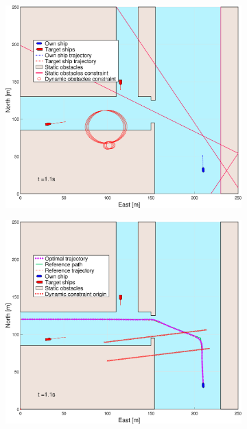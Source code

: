 \begin{figure}[!ht] %
    \begin{subfigure}[b]{0.494\textwidth}
        \centering
        \includegraphics[width=\textwidth]{Images/Figures/Havn1/_Simple_1fig1_time=1}
        \subcaption{}
    \end{subfigure}
    \hfill
    \begin{subfigure}[b]{0.494\textwidth}
        \centering
        \includegraphics[width=\textwidth]{Images/Figures/Havn1/_Simple_1fig999_time=1}

\end{subfigure}
\end{figure}
